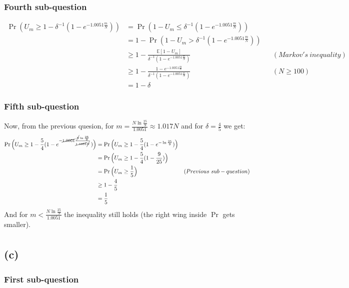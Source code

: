 \documentclass[a4paper]{article}
\newcommand{\E}{\mathbb{E}}
\newcommand{\qedsquare}{\tag*{$\square$}}
\newcommand{\mn}{\frac{m}{N}}
\newcommand{\e}{e^{-1.0051 \mn}}
\newcommand{\df}{\delta^{-1}(1-\e)}
\newcommand{\odf}{1-\delta^{-1}(1-\e)}
\begin{document}
\newpage

\subsubsection {Fourth sub-question}

\begin{align*}
    \Pr( U_m \geq \odf)
    &= \Pr( 1 - U_m \leq \df ) \\
    &= 1 - \Pr( 1 - U_m > \df ) \\
    &\geq 1 - \frac{\E[1-U_m]}{\df} && (Markov's\ inequality) \\
    &\geq 1 - \frac{1-\e}{\df} && (N \geq 100) \\
    &= 1 - \delta
    \qedsquare
\end{align*}

\subsubsection {Fifth sub-question}

Now, from the previous quesion, for $ m = \frac{ N \ln \frac{25}{9} }{1.0051} \approx 1.017 N $ and for $ \delta=\frac{4}{5} $ we get: \\
\begin{align*}
    \Pr \Big( U_m \geq 1 - \frac{5}{4} ( 1 - e^{ - \cancel{1.0051}
        \frac{ \cancel{N} \ln \frac{25}{9} }{\cancel{1.0051} \cancel{N}}} ) \Big)
    &= \Pr \Big( U_m \geq 1 - \frac{5}{4} ( 1 - e^{ - \ln \frac{25}{9} } ) \Big) \\
    &= \Pr \Big( U_m \geq 1 - \frac{5}{4} ( 1 - \frac{9}{25} ) \Big) \\
    &= \Pr \Big( U_m \geq \frac{1}{5} \Big) && (Previous\ sub-question) \\
    &\geq 1 - \frac{4}{5} \\
    &= \frac{1}{5}
\end{align*}
And for $m < \frac{ N \ln \frac{25}{9} }{1.0051} $ the inequality still holds (the right wing inside $\Pr$ gets smaller).
\begin{align*}
    \qedsquare
\end{align*}

\newpage

\subsection {(c)}

\subsubsection {First sub-question}
\end{document}
